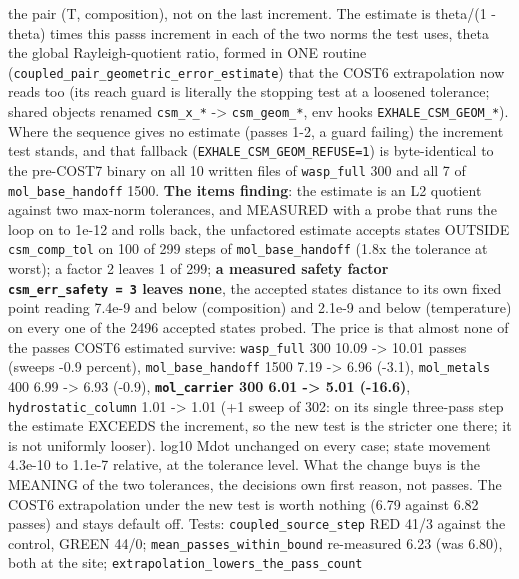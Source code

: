 \documentclass[english,a4paper]{my_memo}
\begin{document}
\begin{itemize}
{  the pair (T, composition), not on the last increment.} The estimate is
  \textbar theta/(1 - theta)\textbar{} times this pass\textquotesingle s increment in each of the two norms
  the test uses, theta the global Rayleigh-quotient ratio, formed in ONE
  routine (\texttt{coupled\_pair\_geometric\_error\_estimate}) that the COST6
  extrapolation now reads too (its reach guard is literally the stopping
  test at a loosened tolerance; shared objects renamed \texttt{csm\_x\_*} -\textgreater{}
  \texttt{csm\_geom\_*}, env hooks \texttt{EXHALE\_CSM\_GEOM\_*}). Where the sequence gives no
  estimate (passes 1-2, a guard failing) the increment test stands, and
  that fallback (\texttt{EXHALE\_CSM\_GEOM\_REFUSE=1}) is byte-identical to the
  pre-COST7 binary on all 10 written files of \texttt{wasp\_full} 300 and all 7 of
  \texttt{mol\_base\_handoff} 1500. \textbf{The item\textquotesingle s finding}: the estimate is an L2
  quotient against two max-norm tolerances, and MEASURED with a probe that
  runs the loop on to 1e-12 and rolls back, the unfactored estimate accepts
  states OUTSIDE \texttt{csm\_comp\_tol} on 100 of 299 steps of \texttt{mol\_base\_handoff}
  (1.8x the tolerance at worst); a factor 2 leaves 1 of 299; \textbf{a measured
  safety factor \texttt{csm\_err\_safety\ =\ 3} leaves none}, the accepted state\textquotesingle s
  distance to its own fixed point reading 7.4e-9 and below (composition)
  and 2.1e-9 and below (temperature) on every one of the 2496 accepted
  states probed. The price is that almost none of the passes COST6
  estimated survive: \texttt{wasp\_full} 300 10.09 -\textgreater{} 10.01 passes (sweeps -0.9
  percent), \texttt{mol\_base\_handoff} 1500 7.19 -\textgreater{} 6.96 (-3.1), \texttt{mol\_metals} 400
  6.99 -\textgreater{} 6.93 (-0.9), \textbf{\texttt{mol\_carrier} 300 6.01 -\textgreater{} 5.01 (-16.6)},
  \texttt{hydrostatic\_column} 1.01 -\textgreater{} 1.01 (+1 sweep of 302: on its single
  three-pass step the estimate EXCEEDS the increment, so the new test is
  the stricter one there; it is not uniformly looser). log10 Mdot unchanged
  on every case; state movement 4.3e-10 to 1.1e-7 relative, at the
  tolerance level. What the change buys is the MEANING of the two
  tolerances, the decision\textquotesingle s own first reason, not passes. The COST6
  extrapolation under the new test is worth nothing (6.79 against 6.82
  passes) and stays default off. Tests: \texttt{coupled\_source\_step} RED 41/3
  against the control, GREEN 44/0; \texttt{mean\_passes\_within\_bound} re-measured
  6.23 (was 6.80), both at the site; \texttt{extrapolation\_lowers\_the\_pass\_count}

\end{itemize}
\end{document}
